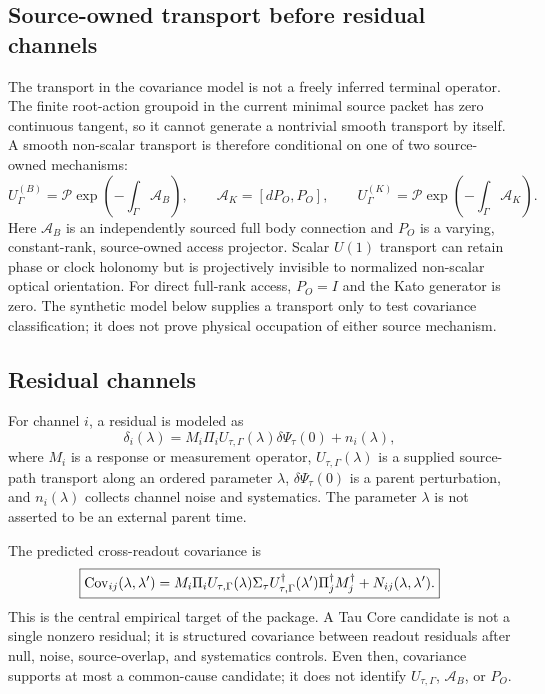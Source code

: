 \documentclass[12pt]{article}
\begin{document}
\subsection{Source-owned transport before residual channels}

The transport in the covariance model is not a freely inferred terminal
operator. The finite root-action groupoid in the current minimal source
packet has zero continuous tangent, so it cannot generate a nontrivial smooth
transport by itself. A smooth non-scalar transport is therefore conditional
on one of two source-owned mechanisms:
\[
  U_{\Gamma}^{(B)}=
  \mathcal P\exp\!\left(-\int_{\Gamma}\mathcal A_B\right),
  \qquad
  \mathcal A_K=[dP_O,P_O],
  \qquad
  U_{\Gamma}^{(K)}=
  \mathcal P\exp\!\left(-\int_{\Gamma}\mathcal A_K\right).
\]
Here \(\mathcal A_B\) is an independently sourced full body connection and
\(P_O\) is a varying, constant-rank, source-owned access projector. Scalar
\(U(1)\) transport can retain phase or clock holonomy but is projectively
invisible to normalized non-scalar optical orientation. For direct full-rank
access, \(P_O=I\) and the Kato generator is zero. The synthetic model below
supplies a transport only to test covariance classification; it does not prove
physical occupation of either source mechanism.

\subsection{Residual channels}

For channel \(i\), a residual is modeled as
\[
  \delta_i(\lambda)
  =
  M_i\Pi_iU_{\tau,\Gamma}(\lambda)\delta\Psi_{\tau}(0)+n_i(\lambda),
  \label{eq:channel-residual}
\]
where \(M_i\) is a response or measurement operator,
\(U_{\tau,\Gamma}(\lambda)\) is a supplied source-path transport along an
ordered parameter \(\lambda\), \(\delta\Psi_{\tau}(0)\) is a parent
perturbation, and \(n_i(\lambda)\) collects channel noise and systematics.
The parameter \(\lambda\) is not asserted to be an external parent time.

The predicted cross-readout covariance is
\[
  \boxed{
  {\rm Cov}_{ij}(\lambda,\lambda')
  =
  M_i\Pi_iU_{\tau,\Gamma}(\lambda)
  \Sigma_{\tau}
  U_{\tau,\Gamma}^{\dagger}(\lambda')
  \Pi_j^{\dagger}M_j^{\dagger}
  +
  N_{ij}(\lambda,\lambda').
  }
  \label{eq:cross-readout-covariance}
\]
This is the central empirical target of the package. A Tau Core candidate is
not a single nonzero residual; it is structured covariance between readout
residuals after null, noise, source-overlap, and systematics controls. Even
then, covariance supports at most a common-cause candidate; it does not
identify \(U_{\tau,\Gamma}\), \(\mathcal A_B\), or \(P_O\).
\end{document}
